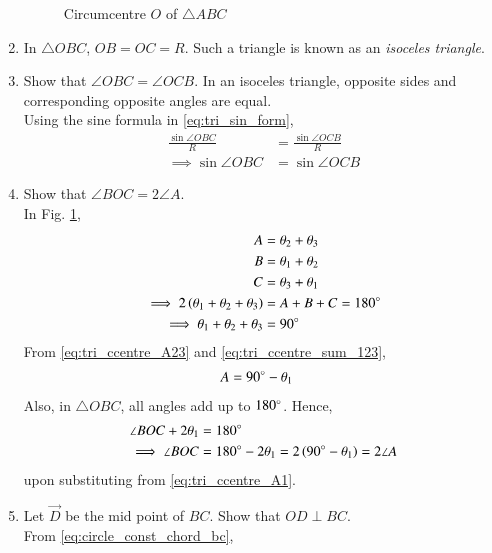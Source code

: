 \begin{enumerate}[label=\arabic*.,ref=\thesubsection.\theenumi]
\begin{figure}[!ht]
\begin{center}
		\resizebox{\columnwidth}{!}{}
	\end{center}
	\caption{Circumcentre $O$ of $\triangle ABC$}
	\label{fig:tri_ccentre}	
\end{figure}
%
\item In $\triangle OBC$, $OB = OC = R$.  Such a triangle is known as an {\em isoceles triangle}.
%
\item Show that $\angle OBC = \angle OCB$.  In an isoceles triangle, opposite sides and corresponding opposite angles are equal.
\label{prob:tri_ang_side_eq}
\\
\solution Using the sine formula in \eqref{eq:tri_sin_form},%
\begin{align}
\frac{\sin \angle OBC}{R} &= \frac{\sin \angle OCB}{R}
\\
\implies \sin \angle OBC &= \sin \angle OCB
\end{align}
%
\item  Show that $\angle BOC = 2\angle A$.
\label{prob:tri_ccentre_subtend}
%
\\
\solution In Fig. \ref{fig:tri_ccentre}, 
%
\begin{align}
%
\label{eq:tri_ccentre_A23}
A &= \theta_2+\theta_3
\\
B &= \theta_1+\theta_2
\\
C &= \theta_3+\theta_1
\\
\implies 2\brak{\theta_1+\theta_2+\theta_3} &= A+B+C =180\degree
\\
\implies \theta_1+\theta_2+\theta_3 &= 90\degree
\label{eq:tri_ccentre_sum_123}
\end{align}
%
From \eqref{eq:tri_ccentre_A23} and \eqref{eq:tri_ccentre_sum_123},
%
\begin{align}
%
\label{eq:tri_ccentre_A1}
A &= 90\degree - \theta_1
\end{align}
%
Also, in $\triangle OBC$, all angles add up to $180\degree$.  Hence, 
%
\begin{align}
\angle BOC + 2\theta_1 &= 180\degree
\\
\implies \angle BOC &= 180\degree - 2\theta_1 = 2 \left(90\degree - \theta_1\right)
= 2\angle A
\end{align}
%
upon substituting from \eqref{eq:tri_ccentre_A1}.
%
\item Let $\vec{D}$ be the mid point of $BC$.  Show that $OD \perp BC$.
\label{prob:tri_perp_bisect}
%
\\
\solution From \eqref{eq:circle_const_chord_bc}, 
%
\begin{align}

\end{align}
\end{enumerate}
